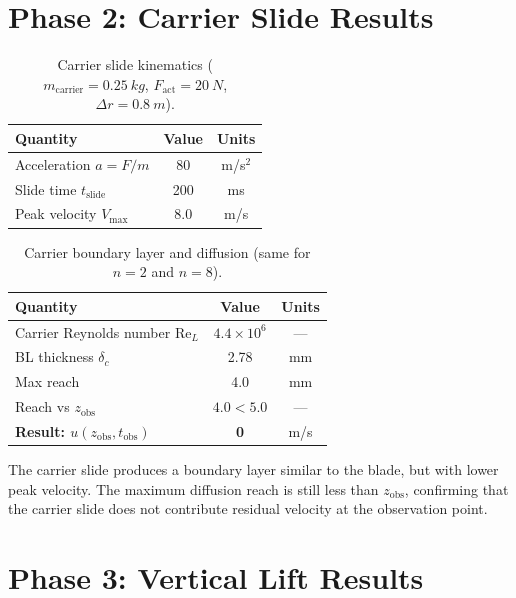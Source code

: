 \documentclass[11pt,a4paper]{article}
\begin{document}
\section{Phase 2: Carrier Slide Results}
\label{sec:results_carrier}

\begin{table}[H]
\centering
\caption{Carrier slide kinematics ($m_\mathrm{carrier} = \SI{0.25}{kg}$,
$F_\mathrm{act} = \SI{20}{N}$, $\Delta r = \SI{0.8}{m}$).}
\label{tab:carrier_kinematics}
\begin{tabular}{lcc}
\toprule
Quantity & Value & Units \\
\midrule
Acceleration $a = F/m$ & 80 & m/s$^2$ \\
Slide time $t_\mathrm{slide}$ & 200 & ms \\
Peak velocity $V_\mathrm{max}$ & 8.0 & m/s \\
\bottomrule
\end{tabular}
\end{table}

\begin{table}[H]
\centering
\caption{Carrier boundary layer and diffusion (same for $n = 2$ and $n = 8$).}
\label{tab:carrier_BL}
\begin{tabular}{lcc}
\toprule
Quantity & Value & Units \\
\midrule
Carrier Reynolds number Re$_L$ & $4.4 \times 10^6$ & --- \\
BL thickness $\delta_c$ & 2.78 & mm \\
Max reach & 4.0 & mm \\
Reach vs $z_\mathrm{obs}$ & $4.0 < 5.0$ & --- \\
\midrule
\textbf{Result: $u(z_\mathrm{obs}, t_\mathrm{obs})$} & \textbf{0} & m/s \\
\bottomrule
\end{tabular}
\end{table}

The carrier slide produces a boundary layer similar to the blade, but with
lower peak velocity. The maximum diffusion reach is still less than
$z_\mathrm{obs}$, confirming that the carrier slide does not contribute
residual velocity at the observation point.


\section{Phase 3: Vertical Lift Results}
\label{sec:results_lift}
\end{document}
